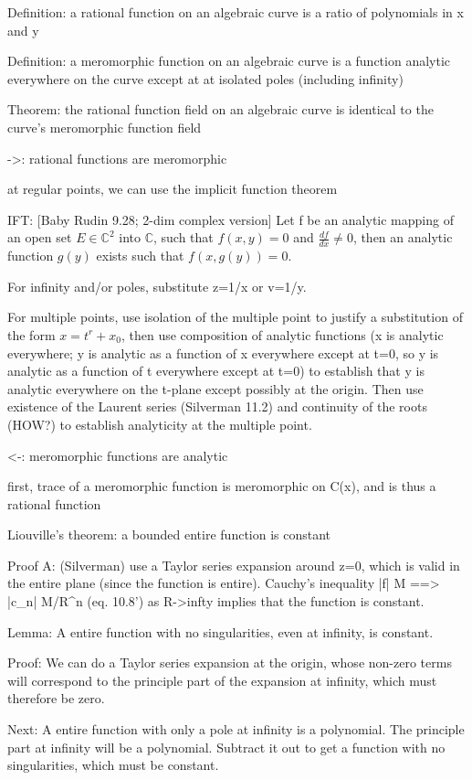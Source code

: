 
Definition: a rational function on an algebraic curve is a ratio
of polynomials in x and y

Definition: a meromorphic function on an algebraic curve is a function
analytic everywhere on the curve except at at isolated poles
(including infinity)

Theorem: the rational function field on an algebraic curve is identical
to the curve's meromorphic function field

->: rational functions are meromorphic

at regular points, we can use the implicit function theorem

IFT: [Baby Rudin 9.28; 2-dim complex version] Let f be an analytic
mapping of an open set $E \in {\mathbb C}^2$ into ${\mathbb C}$, such
that $f(x,y)=0$ and $\frac{df}{dx} \ne 0$, then an analytic
function $g(y)$ exists such that $f(x,g(y))=0$.

For infinity and/or poles, substitute z=1/x or v=1/y.

For multiple points, use isolation of the multiple point to justify a
substitution of the form $x=t^r+x_0$, then use composition of analytic
functions (x is analytic everywhere; y is analytic as a function of x
everywhere except at t=0, so y is analytic as a function of t
everywhere except at t=0) to establish that y is analytic everywhere
on the t-plane except possibly at the origin.  Then use existence of
the Laurent series (Silverman 11.2) and continuity of the roots (HOW?)
to establish analyticity at the multiple point.

<-: meromorphic functions are analytic

first, trace of a meromorphic function is meromorphic on C(x), and is
thus a rational function

Liouville's theorem: a bounded entire function is constant

Proof A: (Silverman) use a Taylor series expansion around z=0, which
is valid in the entire plane (since the function is entire).  Cauchy's
inequality |f| \le M ==> |c_n| \le M/{R^n} (eq. 10.8') as R->infty
implies that the function is constant.

Lemma: A entire function with no singularities, even at infinity, is
constant.

Proof: We can do a Taylor series expansion at the origin, whose
non-zero terms will correspond to the principle part of the expansion
at infinity, which must therefore be zero.

Next: A entire function with only a pole at infinity is a polynomial.
The principle part at infinity will be a polynomial.  Subtract it out
to get a function with no singularities, which must be constant.

